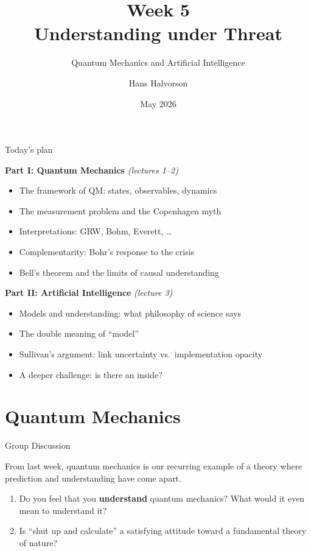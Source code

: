 \documentclass[fleql]{beamer}
\title{Week 5 \\ Understanding under Threat}
\subtitle{Quantum Mechanics and Artificial Intelligence}
\author{Hans Halvorson}
\date{May 2026}
\begin{document}
\begin{frame}
  \titlepage
\end{frame}

\begin{frame}{Today's plan}

  \textbf{Part I: Quantum Mechanics} \hfill \emph{(lectures 1--2)}
  \begin{itemize}\small
  \item The framework of QM: states, observables, dynamics
  \item The measurement problem and the Copenhagen myth
  \item Interpretations: GRW, Bohm, Everett, \ldots
  \item Complementarity: Bohr's response to the crisis
  \item Bell's theorem and the limits of causal understanding
  \end{itemize}

  \vspace{0.8em}
  \textbf{Part II: Artificial Intelligence} \hfill \emph{(lecture 3)}
  \begin{itemize}\small
  \item Models and understanding: what philosophy of science says
  \item The double meaning of ``model''
  \item Sullivan's argument: link uncertainty vs.\ implementation opacity
  \item A deeper challenge: is there an inside?
  \end{itemize}

\end{frame}


\part{Quantum Mechanics}

\begin{frame}{Group Discussion}

  From last week, quantum mechanics is our recurring example of a
  theory where prediction and understanding have come apart.

  \vspace{0.8em}
  \begin{enumerate}
  \item Do you feel that you \textbf{understand} quantum mechanics?
    What would it even mean to understand it?
  \item Is ``shut up and calculate'' a satisfying attitude toward a
    fundamental theory of nature?
  \end{enumerate}

\end{frame}
\end{document}
